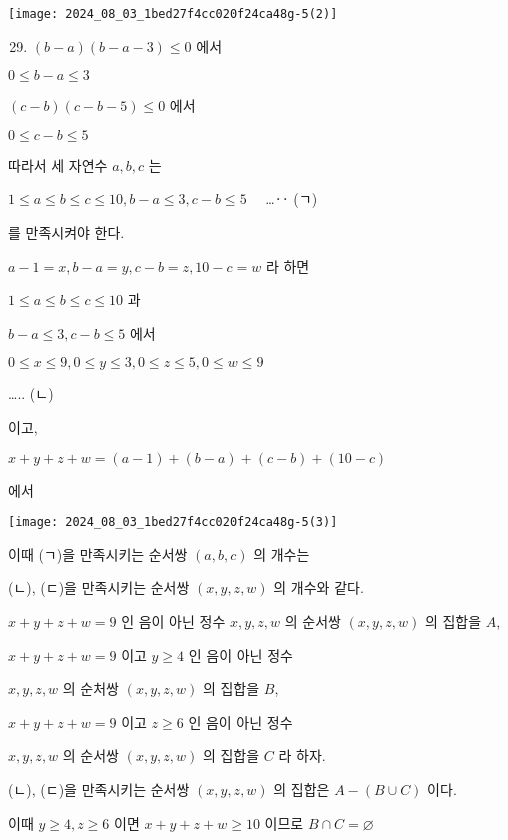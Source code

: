 \documentclass[10pt]{article}
\begin{document}
\begin{center}
\texttt{[image: 2024\_08\_03\_1bed27f4cc020f24ca48g-5(2)]}
\end{center}

\begin{enumerate}
  \setcounter{enumi}{28}
  \item \((b-a)(b-a-3) \leq 0\) 에서
\end{enumerate}

\(0 \leq b-a \leq 3\)

\((c-b)(c-b-5) \leq 0\) 에서

\(0 \leq c-b \leq 5\)

따라서 세 자연수 \(a, b, c\) 는

\(1 \leq a \leq b \leq c \leq 10, b-a \leq 3, c-b \leq 5 \quad\) …‥ (ㄱ)

를 만족시켜야 한다.

\(a-1=x, b-a=y, c-b=z, 10-c=w\) 라 하면

\(1 \leq a \leq b \leq c \leq 10\) 과

\(b-a \leq 3, c-b \leq 5\) 에서

\(0 \leq x \leq 9,0 \leq y \leq 3,0 \leq z \leq 5,0 \leq w \leq 9\)

….. (ㄴ)

이고,

\(x+y+z+w=(a-1)+(b-a)+(c-b)+(10-c)\)

에서

\begin{center}
\texttt{[image: 2024\_08\_03\_1bed27f4cc020f24ca48g-5(3)]}
\end{center}

이때 (ㄱ)을 만족시키는 순서쌍 \((a, b, c)\) 의 개수는

(ㄴ), (ㄷ)을 만족시키는 순서쌍 \((x, y, z, w)\) 의 개수와 같다.

\(x+y+z+w=9\) 인 음이 아닌 정수 \(x, y, z, w\) 의 순서쌍 \((x, y, z, w)\) 의 집합을 \(A\),

\(x+y+z+w=9\) 이고 \(y \geq 4\) 인 음이 아닌 정수

\(x, y, z, w\) 의 순처쌍 \((x, y, z, w)\) 의 집합을 \(B\),

\(x+y+z+w=9\) 이고 \(z \geq 6\) 인 음이 아닌 정수

\(x, y, z, w\) 의 순서쌍 \((x, y, z, w)\) 의 집합을 \(C\) 라 하자.

(ㄴ), (ㄷ)을 만족시키는 순서쌍 \((x, y, z, w)\) 의 집합은 \(A-(B \cup C)\) 이다.

이때 \(y \geq 4, z \geq 6\) 이면 \(x+y+z+w \geq 10\) 이므로 \(B \cap C=\varnothing\)
\end{document}
